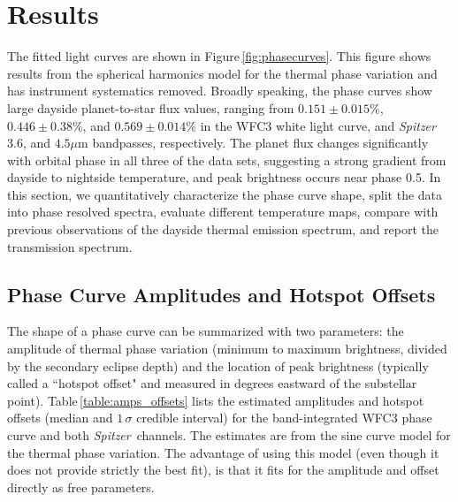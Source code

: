 \documentclass[twocolumn]{aastex61}
\newcommand{\project}[1]{\textsl{#1}}
\newcommand{\Spitzer}{\project{Spitzer}}
\begin{document}
\section{Results}
\label{sec:results}
The fitted light curves are shown in Figure\,\ref{fig:phasecurves}. This figure shows results from the spherical harmonics model for the thermal phase variation and has instrument systematics removed.  Broadly speaking, the phase curves show large dayside planet-to-star flux values, ranging from $0.151\pm0.015\%$, $0.446\pm0.38\%$, and $0.569\pm0.014\%$ in the WFC3 white light curve, and \Spitzer\ $3.6$, and $4.5\mu$m bandpasses, respectively.  The planet flux changes significantly with orbital phase in all three of the data sets, suggesting a strong gradient from dayside to nightside temperature, and peak brightness occurs near phase 0.5. In this section, we quantitatively characterize the phase curve shape, split the data into phase resolved spectra, evaluate different temperature maps, compare with previous observations of the dayside thermal emission spectrum, and report the transmission spectrum.


\subsection{Phase Curve Amplitudes and Hotspot Offsets}
The shape of a phase curve can be summarized with two parameters: the amplitude of thermal phase variation (minimum to maximum brightness, divided by the secondary eclipse depth) and the location of peak brightness (typically called a ``hotspot offset" and measured in degrees eastward of the substellar point).  Table\,\ref{table:amps_offsets} lists the estimated amplitudes and hotspot offsets (median and $1\,\sigma$ credible interval) for the band-integrated WFC3 phase curve and both \Spitzer\ channels. The estimates are from the sine curve model for the thermal phase variation. The advantage of using this model (even though it does not provide strictly the best fit), is that it fits for the amplitude and offset directly as free parameters. 

\end{document}
